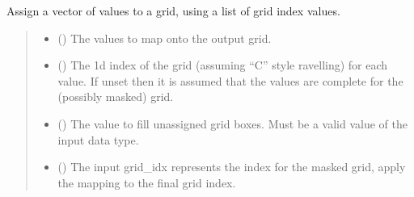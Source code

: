 \documentclass[letterpaper,10pt,english]{sphinxmanual}
\begin{document}
\begin{fulllineitems}
\begin{fulllineitems}
\begin{quote}
\begin{description}
\end{description}\end{quote}

\end{fulllineitems}


\begin{fulllineitems}
\label{\detokenize{grid:glomar_gridding.grid.Grid.assign_values}}
\pysigstartsignatures
\pysiglinewithargsret
{}
{\sphinxparamcomma {}\sphinxparamcomma {}\sphinxparamcomma {}}
{}
\pysigstopsignatures
\sphinxAtStartPar
Assign a vector of values to a grid, using a list of grid index values.
\begin{quote}\begin{description}
\begin{itemize}
\item {}
\sphinxAtStartPar
{} () \textendash{} The values to map onto the output grid.

\item {}
\sphinxAtStartPar
{} () \textendash{} The 1d index of the grid (assuming “C” style ravelling) for each
value. If unset then it is assumed that the values are complete for
the (possibly masked) grid.

\item {}
\sphinxAtStartPar
{} () \textendash{} The value to fill unassigned grid boxes. Must be a valid value of
the input  data type.

\item {}
\sphinxAtStartPar
{} () \textendash{} The input grid\_idx represents the index for the masked grid, apply
the mapping to the final grid index.


\end{itemize}
\end{description}
\end{quote}
\end{fulllineitems}
\end{fulllineitems}
\end{document}
